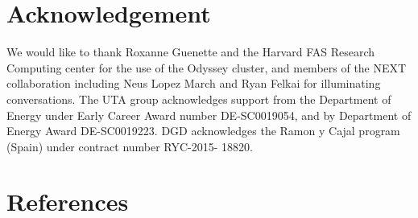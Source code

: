 \documentclass[3p,11pt]{elsarticle}
\begin{document}
\section*{Acknowledgement}
We would like to thank Roxanne Guenette and the Harvard FAS Research Computing center for the use of the Odyssey cluster, and members of the NEXT collaboration including Neus Lopez March and Ryan Felkai for illuminating conversations.  The UTA group acknowledges support from the Department of Energy under Early Career Award number DE-SC0019054, and by Department of Energy Award DE-SC0019223. DGD acknowledges the Ramon y Cajal program (Spain) under contract number RYC-2015- 18820.

\section*{References}




\end{document}
